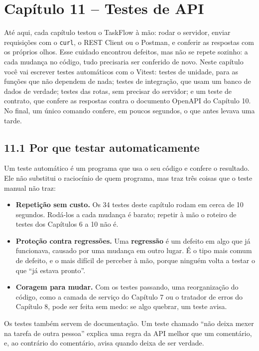\section{Capítulo 11 -- Testes de API}

Até aqui, cada capítulo testou o TaskFlow à mão: rodar o servidor, enviar requisições com o \texttt{curl}, o REST Client ou o Postman, e conferir as respostas com os próprios olhos. Esse cuidado encontrou defeitos, mas não se repete sozinho: a cada mudança no código, tudo precisaria ser conferido de novo. Neste capítulo você vai escrever testes automáticos com o Vitest: testes de unidade, para as funções que não dependem de nada; testes de integração, que usam um banco de dados de verdade; testes das rotas, sem precisar do servidor; e um teste de contrato, que confere as respostas contra o documento OpenAPI do Capítulo 10. No final, um único comando confere, em poucos segundos, o que antes levava uma tarde.

\subsection{11.1 Por que testar automaticamente}

Um teste automático é um programa que usa o seu código e confere o resultado. Ele não substitui o raciocínio de quem programa, mas traz três coisas que o teste manual não traz:

\begin{itemize}
  \item \textbf{Repetição sem custo.} Os 34 testes deste capítulo rodam em cerca de 10 segundos. Rodá-los a cada mudança é barato; repetir à mão o roteiro de testes dos Capítulos 6 a 10 não é.
  \item \textbf{Proteção contra regressões.} Uma \textbf{regressão} é um defeito em algo que já funcionava, causado por uma mudança em outro lugar. É o tipo mais comum de defeito, e o mais difícil de perceber à mão, porque ninguém volta a testar o que ``já estava pronto''.
  \item \textbf{Coragem para mudar.} Com os testes passando, uma reorganização do código, como a camada de serviço do Capítulo 7 ou o tratador de erros do Capítulo 8, pode ser feita sem medo: se algo quebrar, um teste avisa.
\end{itemize}

Os testes também servem de documentação. Um teste chamado ``não deixa mexer na tarefa de outra pessoa'' explica uma regra da API melhor que um comentário, e, ao contrário do comentário, avisa quando deixa de ser verdade.

